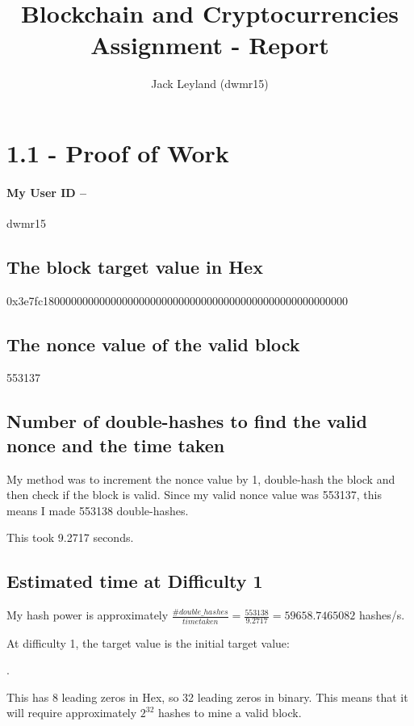 \documentclass[11pt]{article}
\begin{document}
	
	\title{Blockchain and Cryptocurrencies Assignment - Report}
	\author{Jack Leyland (dwmr15)}
	
	\maketitle
	
	\section*{1.1 - Proof of Work}
	\paragraph*{My User ID -- } dwmr15
	
	\subsection*{The block target value in Hex}
	0x3e7fc180000000000000000000000000000000000000000000000000000
	
	\subsection*{The nonce value of the valid block}
	553137
	
	\subsection*{Number of double-hashes to find the valid nonce and the time taken}
	My method was to increment the nonce value by 1, double-hash the block and then check if the block is valid. Since my valid nonce value was 553137, this means I made 553138 double-hashes. 
	
	This took 9.2717 seconds.
	
	\subsection*{Estimated time at Difficulty 1}
	My hash power is approximately $\frac{\#double\_hashes}{time taken} = \frac{553138}{9.2717} = 59658.7465082$ hashes/s. \newline
	
	At difficulty 1, the target value is the initial target value: 
	
	. \newline 
	
	This has 8 leading zeros in Hex, so 32 leading zeros in binary. This means that it will require approximately $2^{32}$ hashes to mine a valid block. \newline
	
\end{document}
